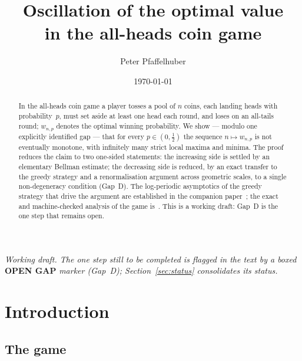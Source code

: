 \documentclass[11pt]{article}
\title{Oscillation of the optimal value\\
       in the all-heads coin game}
\author{Peter Pfaffelhuber}
\date{\today}
\theoremstyle{definition}
\begin{document}
\maketitle

\begin{abstract}
  In the all-heads coin game a player tosses a pool of $n$ coins, each
  landing heads with probability~$p$, must set aside at least one head
  each round, and loses on an all-tails round; $w_{n,p}$ denotes the
  optimal winning probability. We show --- modulo one explicitly
  identified gap --- that for every $p\in(0,\tfrac12)$ the sequence
  $n\mapsto w_{n,p}$ is not eventually monotone, with infinitely many
  strict local maxima and minima. The proof reduces the claim to two
  one-sided statements: the increasing side is settled by an
  elementary Bellman estimate; the decreasing side is reduced, by an
  exact transfer to the greedy strategy and a renormalisation argument
  across geometric scales, to a single non-degeneracy condition
  (Gap~D). The log-periodic asymptotics of the greedy strategy that
  drive the argument are established in the companion
  paper~\cite{Paper2}; the exact and machine-checked analysis of the
  game is~\cite{Paper1}. This is a working draft: Gap~D is the one
  step that remains open.
\end{abstract}

\noindent\emph{\small Working draft. The one step still to be
completed is flagged in the text by a boxed}
{\small\bfseries\color{red!70!black}OPEN GAP} \emph{\small marker
(Gap~D); Section~\ref{sec:status} consolidates its status.}

\section{Introduction}\label{sec:intro}

\subsection{The game}
\end{document}
